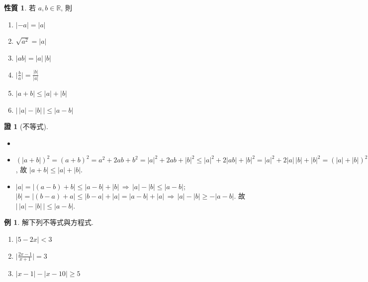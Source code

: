 \documentclass[12pt]{extarticle}
\newcommand{\ds}{\displaystyle}
\newcommand{\ie}{\,\Longrightarrow\,}
\theoremstyle{definition}
\newtheorem*{prp}{性質}
\newtheorem*{ex}{例}
\newtheorem*{prf}{證}
\begin{document}
\begin{prp}
  若 $a, b\in\mathbb{R}$, 則
  \setlength{\columnsep}{-20mm}
  \begin{multicols}{3}
    \begin{enumerate}\setlength\itemsep{0em}
      \item $\ds |-a| = |a|$
      \item $\ds \sqrt{a^2} = |a|$
      \item $\ds |a b| = |a|\,|b|$
      \item $\ds \Big|\frac{b}{a}\Big| = \frac{|b|}{|a|}$
      \item $\ds |a + b|\leqslant|a| + |b|$
      \item $\ds \big|\,|a| - |b|\,\big|\leqslant|a - b|$
    \end{enumerate}
  \end{multicols}
\end{prp}

\begin{prf}[不等式]
  \begin{itemize}\setlength\itemsep{0em}
    \item[]
    \item $\ds (|a + b|)^2 = (a + b)^2 = a^2 + 2 a b + b^2 = |a|^2 + 2 a b + |b|^2 \leqslant |a|^2 + 2 |a b| + |b|^2 = |a|^2 + 2 |a|\,|b| + |b|^2 = (|a| + |b|)^2$, 故 $\ds |a + b|\leqslant|a| + |b|$. 
    \item $\ds |a| = |(a - b) + b| \leqslant |a - b| + |b| \ie |a| - |b| \leqslant |a - b|$;  $\ds |b| = |(b - a) + a| \leqslant |b - a| + |a| = |a - b| + |a| \ie |a| - |b| \geqslant -|a - b|$.  故 $\ds \big|\,|a| - |b|\,\big|\leqslant|a - b|$. 
  \end{itemize}
\end{prf}

\begin{ex}
  解下列不等式與方程式. 
  \setlength{\columnsep}{-20mm}
  \begin{multicols}{3}
    \begin{enumerate}\setlength\itemsep{0em}
      \item $\ds |5 - 2x| < 3$
      \item $\ds \Big|\frac{2 x - 1}{x + 1}\Big| = 3$
      \item $\ds |x - 1| - |x - 10|\geqslant 5$
    \end{enumerate}
  \end{multicols}
\end{ex}
\end{document}
